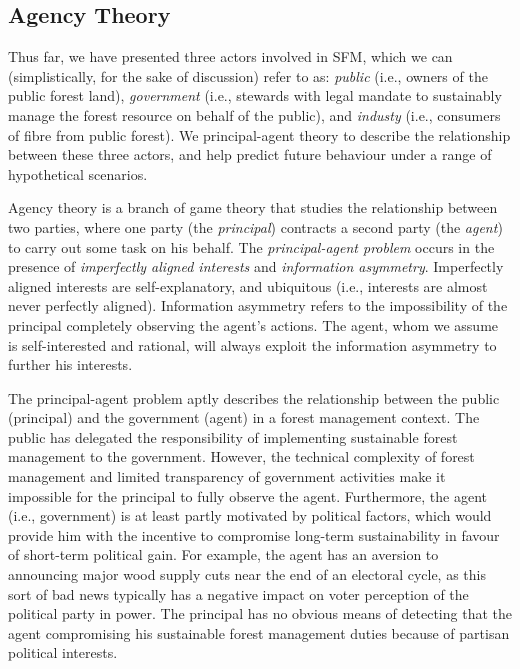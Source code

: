 \subsection{Agency Theory}

Thus far, we have presented three actors involved in SFM, which we can (simplistically, for the sake of discussion) refer to as: \emph{public} (i.e., owners of the public forest land), \emph{government} (i.e., stewards with legal mandate to sustainably manage the forest resource on behalf of the public), and \emph{industy} (i.e., consumers of fibre from public forest). We principal-agent theory \citep{laffont2002theory} to describe the relationship between these three actors, and help predict future behaviour under a range of hypothetical scenarios.

Agency theory is a branch of game theory that studies the relationship between two parties, where one party (the \emph{principal}) contracts a second party (the \emph{agent}) to carry out some task on his behalf. The \emph{principal-agent problem} occurs in the presence of \emph{imperfectly aligned interests} and \emph{information asymmetry}. Imperfectly aligned interests are self-explanatory, and ubiquitous (i.e., interests are almost never perfectly aligned). Information asymmetry refers to the impossibility of the principal completely observing the agent's actions. The agent, whom we assume is self-interested and rational, will always exploit the information asymmetry to further his interests.  

The principal-agent problem aptly describes the relationship between the public (principal) and the government (agent) in a forest management context. The public has delegated the responsibility of implementing sustainable forest management to the government. However, the technical complexity of forest management and limited transparency of government activities make it impossible for the principal to fully observe the agent. Furthermore, the agent (i.e., government) is at least partly motivated by political factors, which would provide him with the incentive to compromise long-term sustainability in favour of short-term political gain. For example, the agent has an aversion to announcing major wood supply cuts near the end of an electoral cycle, as this sort of bad news typically has a negative impact on voter perception of the political party in power. The principal has no obvious means of detecting that the agent compromising his sustainable forest management duties because of partisan political interests. 

